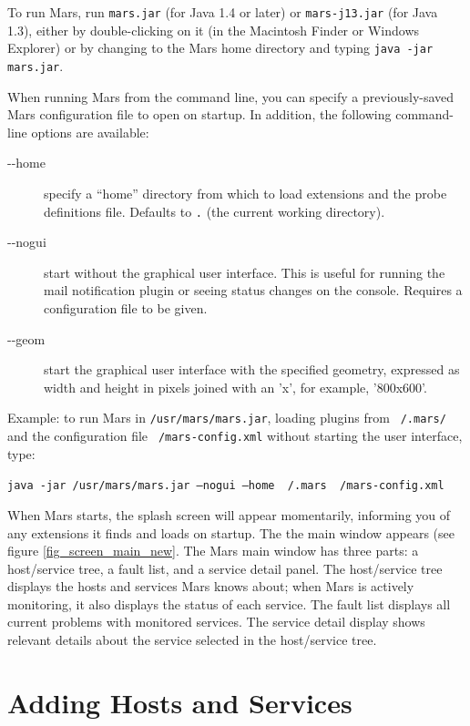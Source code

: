 \documentclass{article}
\newcommand{\filename}[1]{{\tt #1}}
\newcommand{\cmdline}[1]{{\tt #1}}
\begin{document}
To run Mars, run \filename{mars.jar} (for Java 1.4 or later) or
\filename{mars-j13.jar} (for Java 1.3), either by double-clicking on
it (in the Macintosh Finder or Windows Explorer) or by changing to the
Mars home directory and typing \cmdline{java -jar mars.jar}.

When running Mars from the command line, you can specify a
previously-saved Mars configuration file to open on startup. In
addition, the following command-line options are available:

\begin{description}
\item[\mbox{-}\mbox{-}home] specify a ``home'' directory from which to
  load extensions and the probe definitions file. Defaults to
  \filename{.} (the current working directory).
\item[\mbox{-}\mbox{-}nogui] start without the graphical user
  interface. This is useful for running the mail notification plugin
  or seeing status changes on the console. Requires a configuration
  file to be given.
\item[\mbox{-}\mbox{-}geom] start the graphical user interface with
  the specified geometry, expressed as width and height in pixels
  joined with an 'x', for example, '800x600'.
\end{description}

Example: to run Mars in \filename{/usr/mars/mars.jar}, loading plugins
from \filename{~/.mars/} and the configuration file
\filename{~/mars-config.xml} without starting the user interface,
type:

\cmdline{java -jar /usr/mars/mars.jar --nogui --home ~/.mars
  ~/mars-config.xml}

When Mars starts, the splash screen will appear momentarily, informing
you of any extensions it finds and loads on startup. The the main
window appears (see figure \ref{fig_screen_main_new}.  The Mars main
window has three parts: a host/service tree, a fault list, and a
service detail panel. The host/service tree displays the hosts and
services Mars knows about; when Mars is actively monitoring, it also
displays the status of each service. The fault list displays all
current problems with monitored services. The service detail display
shows relevant details about the service selected in the host/service
tree.

\section{Adding Hosts and Services}
\end{document}
